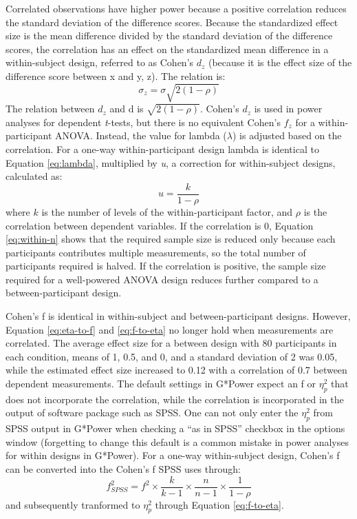 \documentclass[,jou, draftfirst, a4paper,floatsintext]{apa6}
\begin{document}
Correlated observations have higher power because a positive correlation reduces the standard deviation of the difference scores.
Because the standardized effect size is the mean difference divided by the standard deviation of the difference scores, the correlation has an effect on the standardized mean difference in a within-subject design, referred to as Cohen's \(d_z\) (because it is the effect size of the difference score between x and y, z). The relation is:
\begin{equation}
\sigma_{z}=\sigma\sqrt{2(1-\rho)}
\end{equation}
The relation between \(d_z\) and d is \(\sqrt{2(1-\rho)}\).
Cohen's \(d_z\) is used in power analyses for dependent \emph{t}-tests, but there is no equivalent Cohen's \(f_z\) for a within-participant ANOVA.
Instead, the value for lambda (\(\lambda\)) is adjusted based on the correlation.
For a one-way within-participant design lambda is identical to Equation \eqref{eq:lambda}, multiplied by \emph{u}, a correction for within-subject designs, calculated as:
\begin{equation}
u = \frac{k}{1-\rho}
\end{equation}
where \(k\) is the number of levels of the within-participant factor, and \(\rho\) is the correlation between dependent variables.
If the correlation is 0, Equation \eqref{eq:within-n} shows that the required sample size is reduced only because each participants contributes multiple measurements, so the total number of participants required is halved.
If the correlation is positive, the sample size required for a well-powered ANOVA design reduces further compared to a between-participant design.

Cohen's f is identical in within-subject and between-participant designs.
However, Equation \eqref{eq:eta-to-f} and \eqref{eq:f-to-eta} no longer hold when measurements are correlated.
The average effect size for a between design with 80 participants in each condition, means of 1, 0.5, and 0, and a standard deviation of 2 was 0.05, while the estimated effect size increased to 0.12 with a correlation of 0.7 between dependent measurements.
The default settings in G*Power expect an f or \(\eta_p^2\) that does not incorporate the correlation, while the correlation is incorporated in the output of software package such as SPSS.
One can not only enter the \(\eta_p^2\) from SPSS output in G*Power when checking a \enquote{as in SPSS} checkbox in the options window (forgetting to change this default is a common mistake in power analyses for within designs in G*Power).
For a one-way within-subject design, Cohen's f can be converted into the Cohen's f SPSS uses through:
\begin{equation}
f^2_{SPSS} = f^2 \times \frac{k}{k-1} \times \frac{n}{n-1} \times \frac{1}{1-\rho}
\end{equation}
and subsequently tranformed to \(\eta_p^2\) through Equation \eqref{eq:f-to-eta}.
\end{document}
